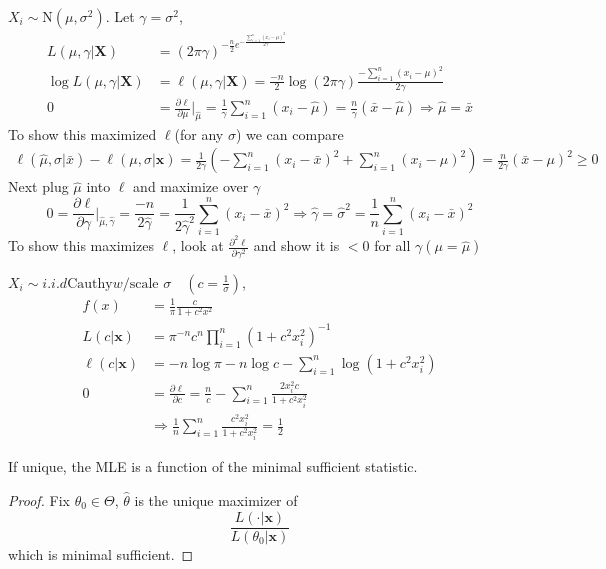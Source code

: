 \documentclass[english, 11pt]{article}
\begin{document}
\begin{exmp}\label{exmp:317}
$X_i\sim\text{N}(\mu, \sigma^2)$. Let $\gamma=\sigma^2$, 
$$
\begin{aligned}
L(\mu, \gamma|\bm{X})&=(2\pi\gamma)^{-\frac{n}{2}e^{-\frac{\sum_{i=1}^n(x_i-\mu)^2}{2\gamma}}}\\
\log L(\mu, \gamma|\bm{X})&=\ell(\mu, \gamma|\bm{X})=\frac{-n}{2}\log(2\pi\gamma)\frac{-\sum_{i=1}^n(x_i-\mu)^2}{2\gamma}\\
0&=\frac{\partial\ell}{\partial\mu}\big|_{\hat{\mu}}=\frac{1}{\gamma}\sum_{i=1}^n(x_i-\hat{\mu})=\frac{n}{\gamma}(\bar{x}-\hat{\mu})\Rightarrow\hat{\mu}=\bar{x}
\end{aligned}
$$
To show this maximized $\ell$(for any $\sigma$) we can compare 
$$
\begin{aligned}
\ell(\hat{\mu}, \sigma|\bar{x})-\ell(\mu, \sigma|\bm{x})=\frac{1}{2\gamma}\left(-\sum_{i=1}^n(x_i-\bar{x})^2+\sum_{i=1}^n(x_i-\mu)^2\right)=\frac{n}{2\gamma}(\bar{x}-\mu)^2\geqslant 0
\end{aligned}
$$
Next plug $\hat{\mu}$ into $\ell$ and maximize over $\gamma$
$$
0=\frac{\partial \ell}{\partial \gamma}\big|_{\hat{\mu}, \hat{\gamma}}=\frac{-n}{2\hat{\gamma}}=\frac{1}{2\hat{\gamma}^2}\sum_{i=1}^n(x_i-\bar{x})^2\Rightarrow \hat{\gamma}=\hat{\sigma}^2=\frac{1}{n}\sum_{i=1}^n(x_i-\bar{x})^2
$$
To show this maximizes $\ell$, look at $\frac{\partial^2\ell}{\partial\gamma^2}$ and show it is $<0$ for all $\gamma(\mu=\hat{\mu})$
\end{exmp}

\begin{exmp}
$X_i\sim i.i.d\text{Cauthy} w/\text{scale } \sigma\quad(c=\frac{1}{\sigma})$, 
$$
\begin{aligned}
f(x)&=\frac{1}{\pi}\frac{c}{1+c^2x^2}\\
L(c|\bm{x})&=\pi^{-n}c^n\prod_{i=1}^n(1+c^2x_i^2)^{-1}\\
\ell(c|\bm{x})&=-n\log\pi-n\log c-\sum_{i=1}^n\log(1+c^2x_i^2)\\
0&=\frac{\partial \ell}{\partial c}=\frac{n}{c}-\sum_{i=1}^n\frac{2x_i^2c}{1+c^2x_i^2}\\
&\Rightarrow\frac{1}{n}\sum_{i=1}^n\frac{c^2x_i^2}{1+c^2x_i^2}=\frac{1}{2}
\end{aligned}
$$
\end{exmp}

\begin{thrm}\label{thrm:318}
If unique, the MLE is a function of the minimal sufficient statistic.
\end{thrm}
\begin{proof}
Fix $\theta_0\in\Theta$, $\hat{\theta}$ is the unique maximizer of 
$$
\frac{L(\cdot|\bm{x})}{L(\theta_0|\bm{x})}
$$
which is minimal sufficient.
\end{proof}
\end{document}
